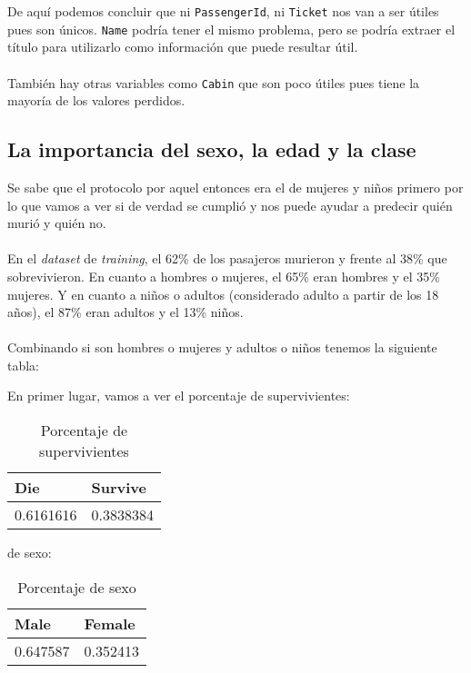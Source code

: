 De aquí podemos concluir que ni \texttt{PassengerId}, ni \texttt{Ticket} nos van a ser útiles pues son únicos. \texttt{Name} podría tener el mismo problema, pero se podría extraer el título para utilizarlo como información que puede resultar útil.
\\ \\
También hay otras variables como \texttt{Cabin} que son poco útiles pues tiene la mayoría de los valores perdidos.

\subsection{La importancia del sexo, la edad y la clase}

Se sabe que el protocolo por aquel entonces era el de mujeres y niños primero por lo que vamos a ver si de verdad se cumplió y nos puede ayudar a predecir quién murió y quién no.
\\ \\
En el \textit{dataset} de \textit{training}, el 62\% de los pasajeros murieron y frente al 38\% que sobrevivieron. En cuanto a hombres o mujeres, el 65\% eran hombres y el 35\% mujeres. Y en cuanto a niños o adultos (considerado adulto a partir de los 18 años), el 87\% eran adultos y el 13\% niños.
\\ \\
Combinando si son hombres o mujeres y adultos o niños tenemos la siguiente tabla:

En primer lugar, vamos a ver el porcentaje de supervivientes:

\begin{table}[H]
	\centering
	\caption{Porcentaje de supervivientes}
	\label{tab:die-survive}
	\begin{tabular}{|ll|}
		\hline
		Die       & Survive   \\ \hline
		0.6161616 & 0.3838384 \\ \hline
	\end{tabular}
\end{table}

de sexo:

\begin{table}[H]
	\centering
	\caption{Porcentaje de sexo}
	\label{tab:male-female}
	\begin{tabular}{|ll|}
		\hline
		Male     & Female   \\ \hline
		0.647587 & 0.352413 \\ \hline
	\end{tabular}
\end{table}

